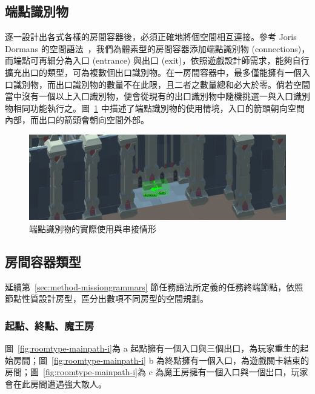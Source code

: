 \subsection{端點識別物}
\label{ssec:method-spacepieces-connections}

逐一設計出各式各樣的房間容器後，必須正確地將個空間相互連接。參考 Joris Dormans 的空間語法~\cite{dormans2012engineering}，我們為體素型的房間容器添加端點識別物 (connections)，而端點可再細分為入口 (entrance) 與出口 (exit)，依照遊戲設計師需求，能夠自行擴充出口的類型，可為複數個出口識別物。在一房間容器中，最多僅能擁有一個入口識別物，而出口識別物的數量不在此限，且二者之數量總和必大於零。倘若空間當中沒有一個以上入口識別物，便會從現有的出口識別物中隨機挑選一與入口識別物相同功能執行之。圖~\ref{fig:connections-in-volume} 中描述了端點識別物的使用情境，入口的箭頭朝向空間內部，而出口的箭頭會朝向空間外部。

\begin{figure}[!htb]
  \begin{center}
    \includegraphics[width=1.0\textwidth]{figures/connections-in-volume.png}
    \caption{端點識別物的實際使用與串接情形} 
    \label{fig:connections-in-volume}
  \end{center}
\end{figure}

\subsection{房間容器類型}
\label{ssec:method-spacepieces-types}

延續第~\ref{sec:method-missiongrammars} 節任務語法所定義的任務終端節點，依照節點性質設計房型，區分出數項不同房型的空間規劃。

\subsubsection{起點、終點、魔王房}
\label{sssec:method-spacepieces-types-mainpath-i}

圖~\ref{fig:roomtype-mainpath-i}為 a 起點擁有一個入口與三個出口，為玩家重生的起始房間；圖~\ref{fig:roomtype-mainpath-i} b 為終點擁有一個入口，為遊戲關卡結束的房間；圖~\ref{fig:roomtype-mainpath-i}為 c 為魔王房擁有一個入口與一個出口，玩家會在此房間遭遇強大敵人。

